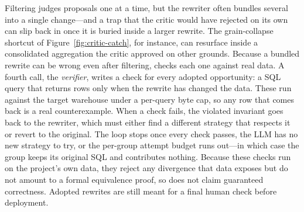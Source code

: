Filtering judges proposals one at a time, but the rewriter often bundles several into a single change—and a trap that the critic would have rejected on its own can slip back in once it is buried inside a larger rewrite. The grain-collapse shortcut of Figure~\ref{fig:critic-catch}, for instance, can resurface inside a consolidated aggregation the critic approved on other grounds. 
Because a bundled rewrite can be wrong even after filtering, \tool{} checks each one against real data. A fourth call, the \emph{verifier}, writes a check for every adopted opportunity: a SQL query that returns rows only when the rewrite has changed the data. These run against the target warehouse under a per-query byte cap, so any row that comes back is a real counterexample. When a check fails, the violated invariant goes back to the rewriter, which must either find a different strategy that respects it or revert to the original. The loop stops once every check passes, the LLM has no new strategy to try, or the per-group attempt budget runs out—in which case the group keeps its original SQL and contributes nothing. Because these checks run on the project's own data, they reject any divergence that data exposes but do not amount to a formal equivalence proof, so \tool{} does not claim guaranteed correctness. Adopted rewrites are still meant for a final human check before deployment.

